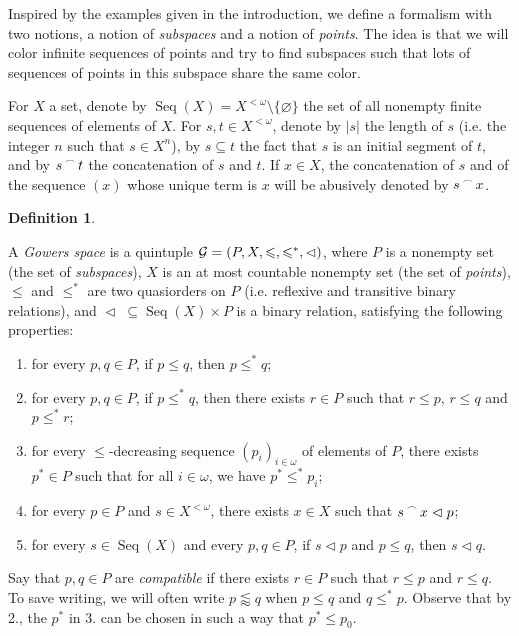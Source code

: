 \documentclass[a4paper,11pt]{article}
\theoremstyle{definition}
\newtheorem{defin}[thm]{Definition}
\numberwithin{equation}{section}
\newcommand{\G}{\mathcal{G}}
\DeclareMathOperator{\Seq}{Seq}
\newcommand{\concat}{%
  \mathbin{\raisebox{1ex}{\scalebox{.7}{$\frown$}}}%
}
\begin{document}
\smallskip

Inspired by the examples given in the introduction, we define a formalism with two notions, a notion of \emph{subspaces} and a notion of \emph{points}. The idea is that we will color infinite sequences of points and try to find subspaces such that lots of sequences of points in this subspace share the same color.

\smallskip

For $X$ a set, denote by $\Seq(X) = X^{< \omega} \setminus \{\varnothing\}$ the set of all nonempty finite sequences of elements of $X$. For $s, t \in X^{< \omega}$, denote by $|s|$ the length of $s$ (i.e. the integer $n$ such that $s \in X^n$), by $s \subseteq t$ the fact that $s$ is an initial segment of $t$, and by $s \concat t$ the concatenation of $s$ and $t$. If $x \in X$, the concatenation of $s$ and of the sequence $(x)$ whose unique term is $x$ will be abusively denoted by $s \concat x$.

\begin{defin}\label{DefGowersSpaces}

A \emph{Gowers space} is a quintuple $\G = (P, X, \leqslant, \leqslant^*, \vartriangleleft\nolinebreak)$, where $P$ is a nonempty set (the set of \emph{subspaces}), $X$ is an at most countable nonempty set (the set of \emph{points}), $\leqslant$ and $\leqslant^*$ are two quasiorders on $P$ (i.e. reflexive and transitive binary relations), and $\vartriangleleft \; \subseteq \Seq(X) \times P$ is a binary relation, satisfying the following properties:

\begin{enumerate}

\item for every $p, q \in P$, if $p \leqslant q$, then $p \leqslant^* q$;

\item for every $p, q \in P$, if $p \leqslant^* q$, then there exists $r \in P$ such that $r \leqslant p$, $r\leqslant q$ and $p \leqslant^* r$;

\item for every $\leqslant$-decreasing sequence $(p_i)_{i \in \omega}$ of elements of $P$, there exists $p^* \in P$ such that for all $i \in \omega$, we have $p^* \leqslant^* p_i$;

\item for every $p \in P$ and $s \in X^{<\omega}$, there exists $x \in X$ such that $s \concat x \vartriangleleft p$;

\item for every $s \in \Seq(X)$ and every $p, q \in P$, if $s \vartriangleleft p$ and $p\leqslant q$, then $s \vartriangleleft q$.

\end{enumerate}

Say that $p, q \in P$ are \emph{compatible} if there exists $r \in P$ such that $r \leqslant p$ and $r \leqslant q$. To save writing, we will often write $p \lessapprox q$ when $p \leqslant q$ and $q \leqslant^* p$. Observe that by 2., the $p^*$ in 3. can be chosen in such a way that $p^* \leqslant p_0$.

\end{defin}
\end{document}
